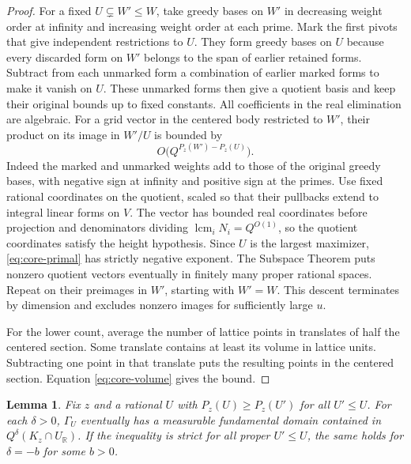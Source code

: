\documentclass[11pt,reqno,a4paper]{amsart}
\newtheorem{lemma}[theorem]{Lemma}
\theoremstyle{remark}
\numberwithin{equation}{section}
\begin{document}
\begin{proof}
For a fixed $U\subsetneq W'\le W$, take greedy bases on $W'$ in
decreasing weight order at infinity and increasing weight order
at each prime. Mark the first pivots that give independent
restrictions to $U$. They form greedy bases on $U$ because every
discarded form on $W'$ belongs to the span of earlier retained
forms. Subtract from each unmarked form a combination of earlier
marked forms to make it vanish on $U$. These unmarked forms then
give a quotient basis and keep their original bounds up to fixed
constants. All coefficients in the real elimination are algebraic.
For a grid vector in the centered body restricted to
$W'$, their product on its image in $W'/U$ is bounded by
\begin{equation}\label{eq:core-primal}
 O\bigl(Q^{P_z(W')-P_z(U)}\bigr).
\end{equation}
Indeed the marked and unmarked weights add to those of the original
greedy bases, with negative sign at infinity and positive sign at
the primes. Use fixed rational coordinates on the quotient, scaled
so that their pullbacks extend to integral linear forms on $V$.
The vector has bounded real coordinates before projection and
denominators dividing $\operatorname{lcm}_i N_i=Q^{O(1)}$, so the
quotient coordinates satisfy the height hypothesis. Since $U$ is
the largest maximizer, \eqref{eq:core-primal} has strictly negative
exponent. The Subspace Theorem puts nonzero quotient vectors
eventually in finitely many proper rational spaces. Repeat on their
preimages in $W'$, starting with $W'=W$. This descent terminates by
dimension and excludes nonzero images for sufficiently large $u$.

For the lower count, average the number of lattice points in
translates of half the centered section. Some translate contains
at least its volume in lattice units. Subtracting one point in that
translate puts the resulting points in the centered section.
Equation \eqref{eq:core-volume} gives the bound.
\end{proof}

\begin{lemma}\label{lem:dual-cells}
Fix $z$ and a rational $U$ with $P_z(U)\ge P_z(U')$ for all $U'\le U$.
For each $\delta>0$, $\Gamma_U$ eventually has a measurable
fundamental domain contained in $Q^\delta(K_z\cap U_{\mathbb R})$.
If the inequality is strict for all proper $U'\le U$, the same
holds for $\delta=-b$ for some $b>0$.
\end{lemma}
\end{document}
